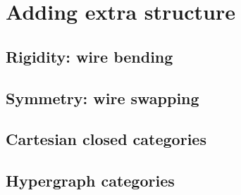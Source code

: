 
\section{Adding extra structure} \label{section:extra structure}

\subsection{Rigidity: wire bending}

\subsection{Symmetry: wire swapping}

\subsection{Cartesian closed categories}

\subsection{Hypergraph categories}
